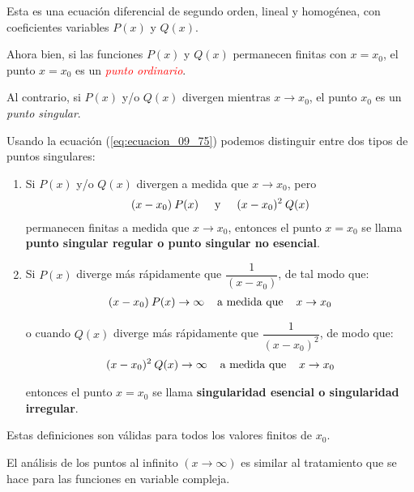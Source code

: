 Esta es una ecuación diferencial de segundo orden, lineal y homogénea, con coeficientes variables $P(x)$ y $Q(x)$.
\par
Ahora bien, si las funciones $P(x)$ y $Q(x)$ permanecen finitas con $x = x_{0}$, el punto $x = x_{0}$ es un \emph{\textcolor{red}{punto ordinario}}.
\par
Al contrario, si $P(x)$ y/o $Q(x)$ divergen mientras $x \to x_{0}$, el punto $x_{0}$ es un \emph{\textcolor{green!50!black}{punto singular}}.
\par
Usando la ecuación (\ref{eq:ecuacion_09_75}) podemos distinguir entre dos tipos de puntos singulares:
\begin{enumerate}
\item Si $P(x)$ y/o $Q(x)$ divergen a medida que $x \to x_{0}$, pero
\begin{align*}
(x - x_{0}) \: P(x) \hspace{0.5cm} \mbox{y} \hspace{0.5cm} (x - x_{0})^{2} \: Q(x)
\end{align*}
permanecen finitas a medida que $x \to x_{0}$,  entonces el punto $x = x_{0}$ se llama \textbf{punto singular regular o punto singular no esencial}.
\item Si $P(x)$ diverge más rápidamente que $\dfrac{1}{(x - x_{0})}$, de tal modo que:
\begin{align*}
(x - x_{0}) \: P(x) \to \infty \hspace{0.4cm} \mbox{a medida que} \hspace{0.4cm} x \to x_{0}
\end{align*}
 
o cuando $Q(x)$ diverge más rápidamente que $\dfrac{1}{(x - x_{0})^{2}}$, de modo que:
\begin{align*}
(x - x_{0})^{2} \: Q(x) \to \infty \hspace{0.4cm} \mbox{a medida que} \hspace{0.4cm} x \to x_{0}
\end{align*}

entonces el punto $x = x_{0}$ se llama \textbf{singularidad esencial o singularidad irregular}.
\end{enumerate}

Estas definiciones son válidas para todos los valores finitos de $x_{0}$. 
\par
El análisis de los puntos al infinito $(x \to \infty)$ es similar al tratamiento que se hace para las funciones en variable compleja.

